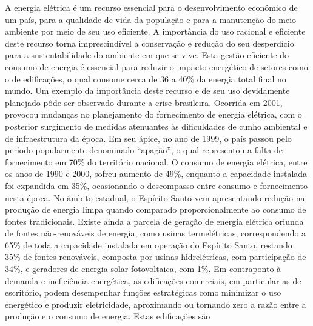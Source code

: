 \begin{onehalfspace}
\footnotesize
    \noindent A energia elétrica é um recurso essencial para o desenvolvimento econômico de 
    um país, para a qualidade de vida da população e para a manutenção do meio ambiente
    por meio de seu uso eficiente. A importância do uso racional e eficiente deste
    recurso torna imprescindível a conservação e redução do seu desperdício para a 
    sustentabilidade do ambiente em que se vive. Esta gestão eficiente do consumo de energia
    é essencial para reduzir o impacto energético de setores como o de edificações, 
    o qual consome cerca de 36 a 40\% da energia total final no mundo.\vspace*{0.3cm} \newline
    \noindent Um exemplo da importância deste recurso e de seu uso devidamente planejado 
    pôde ser observado durante a crise brasileira. Ocorrida em 2001, provocou mudanças 
    no planejamento do fornecimento de energia elétrica, com o posterior surgimento de 
    medidas atenuantes às dificuldades de cunho ambiental e de infraestrutura da época. 
    Em seu ápice, no ano de 1999, o país passou pelo período popularmente denominado 
    “apagão”, o qual representou a falta de fornecimento em 70\% do território nacional. 
    O consumo de energia elétrica, entre os anos de 1990 e 2000, sofreu aumento de 
    49\%, enquanto a capacidade instalada foi expandida em 35\%, ocasionando o 
    descompasso entre consumo e fornecimento nesta época.\vspace*{0.3cm} \newline
    \noindent No âmbito estadual, o Espírito Santo vem apresentando redução na produção 
    de energia limpa quando comparado proporcionalmente ao consumo de fontes tradicionais. 
    Existe ainda a parcela de geração de energia elétrica oriunda de fontes não-renováveis 
    de energia, como usinas termelétricas, correspondendo a 65\% de toda a capacidade 
    instalada em operação do Espírito Santo, restando 35\% de fontes renováveis, composta 
    por usinas hidrelétricas, com participação de 34\%, e geradores de energia solar 
    fotovoltaica, com 1\%.\vspace*{0.3cm} \newline
    \noindent Em contraponto à demanda e ineficiência energética, as edificações
    comerciais, em particular as de escritório, podem desempenhar funções estratégicas 
    como minimizar o uso energético e produzir eletricidade, aproximando ou tornando 
    zero a razão entre a produção e o consumo de energia. Estas edificações são 

\end{onehalfspace}
